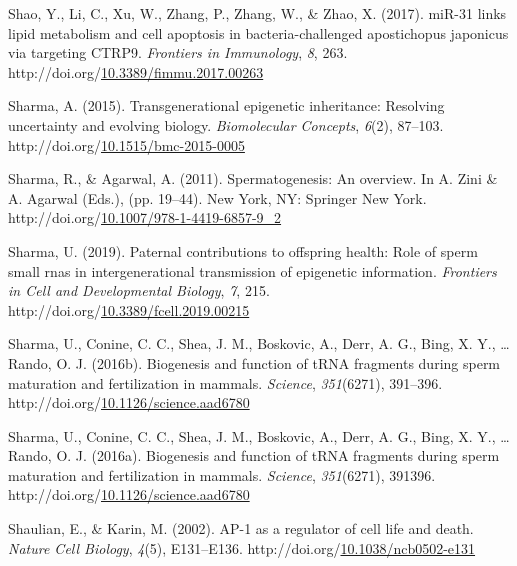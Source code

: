\documentclass[12pt,twoside]{reedthesis}
\newlength{\cslhangindent}
\newenvironment{CSLReferences}[2] %
 {%
  \setlength{\parindent}{0pt}
  \ifodd #1 \everypar{\setlength{\hangindent}{\cslhangindent}}\ignorespaces\fi
  \ifnum #2 > 0
  \setlength{\parskip}{#2\baselineskip}
  \fi
 }%
 {}
\begin{document}
\begin{CSLReferences}{1}{0}
\leavevmode{}%
Shao, Y., Li, C., Xu, W., Zhang, P., Zhang, W., \& Zhao, X. (2017). {miR}-31 links lipid metabolism and cell apoptosis in bacteria-challenged apostichopus japonicus via targeting {CTRP9}. \emph{Frontiers in Immunology}, \emph{8}, 263. http://doi.org/\href{https://doi.org/10.3389/fimmu.2017.00263}{10.3389/fimmu.2017.00263}

\leavevmode{}%
Sharma, A. (2015). Transgenerational epigenetic inheritance: Resolving uncertainty and evolving biology. \emph{Biomolecular Concepts}, \emph{6}(2), 87--103. http://doi.org/\href{https://doi.org/10.1515/bmc-2015-0005}{10.1515/bmc-2015-0005}

\leavevmode{}%
Sharma, R., \& Agarwal, A. (2011). Spermatogenesis: An overview. In A. Zini \& A. Agarwal (Eds.), (pp. 19--44). New York, NY: Springer New York. http://doi.org/\href{https://doi.org/10.1007/978-1-4419-6857-9_2}{10.1007/978-1-4419-6857-9\_2}

\leavevmode{}%
Sharma, U. (2019). Paternal contributions to offspring health: Role of sperm small rnas in intergenerational transmission of epigenetic information. \emph{Frontiers in Cell and Developmental Biology}, \emph{7}, 215. http://doi.org/\href{https://doi.org/10.3389/fcell.2019.00215}{10.3389/fcell.2019.00215}

\leavevmode{}%
Sharma, U., Conine, C. C., Shea, J. M., Boskovic, A., Derr, A. G., Bing, X. Y., \ldots{} Rando, O. J. (2016b). Biogenesis and function of {tRNA} fragments during sperm maturation and fertilization in mammals. \emph{Science}, \emph{351}(6271), 391--396. http://doi.org/\href{https://doi.org/10.1126/science.aad6780}{10.1126/science.aad6780}

\leavevmode{}%
Sharma, U., Conine, C. C., Shea, J. M., Boskovic, A., Derr, A. G., Bing, X. Y., \ldots{} Rando, O. J. (2016a). Biogenesis and function of tRNA fragments during sperm maturation and fertilization in mammals. \emph{Science}, \emph{351}(6271), 391396. http://doi.org/\href{https://doi.org/10.1126/science.aad6780}{10.1126/science.aad6780}

\leavevmode{}%
Shaulian, E., \& Karin, M. (2002). AP-1 as a regulator of cell life and death. \emph{Nature Cell Biology}, \emph{4}(5), E131--E136. http://doi.org/\href{https://doi.org/10.1038/ncb0502-e131}{10.1038/ncb0502-e131}


\end{CSLReferences}
\end{document}
